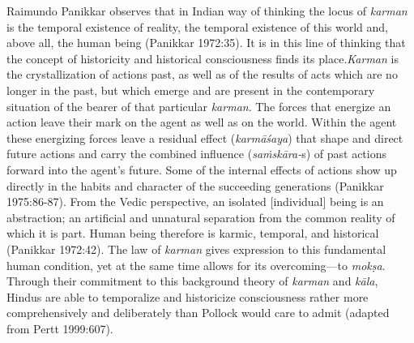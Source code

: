 Raimundo Panikkar observes that in Indian way of thinking the locus of \textit{karman} is the temporal existence of reality, the temporal existence of this world and, above all, the human being (Panikkar 1972:35). It is in this line of thinking that the concept of historicity and historical consciousness finds its place.\textit{Karman} is the crystallization of actions past, as well as of the results of acts which are no longer in the past, but which emerge and are present in the contemporary situation of the bearer of that particular \textit{karman}. The forces that energize an action leave their mark on the agent as well as on the world. Within the agent these energizing forces leave a residual effect (\textit{karmāśaya}) that shape and direct future actions and carry the combined influence (\textit{saṁskāra-}s) of past actions forward into the agent's future. Some of the internal effects of actions show up directly in the habits and character of the succeeding generations (Panikkar 1975:86-87). From the Vedic perspective, an isolated [individual] being is an abstraction; an artificial and unnatural separation from the common reality of which it is part. Human being therefore is karmic, temporal, and historical (Panikkar 1972:42). The law of \textit{karman} gives expression to this fundamental human condition, yet at the same time allows for its overcoming—to \textit{mokṣa}. Through their commitment to this background theory of \textit{karman} and \textit{kāla}, Hindus are able to temporalize and historicize consciousness rather more comprehensively and deliberately than Pollock would care to admit (adapted from Pertt 1999:607).

